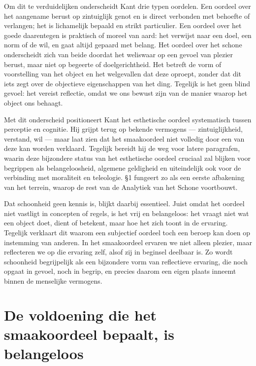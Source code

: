 \begin{mdframed}[leftmargin=0pt,rightmargin=0pt,backgroundcolor=blue!6,linecolor=white,innertopmargin=6pt,innerbottommargin=6pt]
Om dit te verduidelijken onderscheidt Kant drie typen oordelen. Een oordeel over het aangename berust op zintuiglijk genot en is direct verbonden met behoefte of verlangen; het is lichamelijk bepaald en strikt particulier. Een oordeel over het goede daarentegen is praktisch of moreel van aard: het verwijst naar een doel, een norm of de wil, en gaat altijd gepaard met belang. Het oordeel over het schone onderscheidt zich van beide doordat het weliswaar op een gevoel van plezier berust, maar niet op begeerte of doelgerichtheid. Het betreft de vorm of voorstelling van het object en het welgevallen dat deze oproept, zonder dat dit iets zegt over de objectieve eigenschappen van het ding. Tegelijk is het geen blind gevoel: het vereist reflectie, omdat we ons bewust zijn van de manier waarop het object ons behaagt.

Met dit onderscheid positioneert Kant het esthetische oordeel systematisch tussen perceptie en cognitie. Hij grijpt terug op bekende vermogens — zintuiglijkheid, verstand, wil — maar laat zien dat het smaakoordeel niet volledig door een van deze kan worden verklaard. Tegelijk bereidt hij de weg voor latere paragrafen, waarin deze bijzondere status van het esthetische oordeel cruciaal zal blijken voor begrippen als belangeloosheid, algemene geldigheid en uiteindelijk ook voor de verbinding met moraliteit en teleologie. §1 fungeert zo als een eerste afbakening van het terrein, waarop de rest van de Analytiek van het Schone voortbouwt.

Dat schoonheid geen kennis is, blijkt daarbij essentieel. Juist omdat het oordeel niet vastligt in concepten of regels, is het vrij en belangeloos: het vraagt niet wat een object doet, dient of betekent, maar hoe het zich toont in de ervaring. Tegelijk verklaart dit waarom een subjectief oordeel toch een beroep kan doen op instemming van anderen. In het smaakoordeel ervaren we niet alleen plezier, maar reflecteren we op die ervaring zelf, alsof zij in beginsel deelbaar is. Zo wordt schoonheid begrijpelijk als een bijzondere vorm van reflectieve ervaring, die noch opgaat in gevoel, noch in begrip, en precies daarom een eigen plaats inneemt binnen de menselijke vermogens.

\end{mdframed}

\section{De voldoening die het smaakoordeel bepaalt, is belangeloos}

